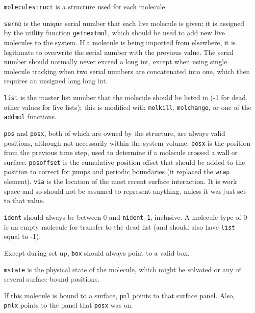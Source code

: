 \documentclass {scrbook}
\newcommand {\ttt} {\texttt}
\begin{document}
\ttt{moleculestruct} is a structure used for each molecule.

\ttt{serno} is the unique serial number that each live molecule is given; it is assigned by the utility function \ttt{getnextmol}, which should be used to add new live molecules to the system. If a molecule is being imported from elsewhere, it is legitimate to overwrite the serial number with the previous value. The serial number should normally never exceed a long int, except when using single molecule tracking when two serial numbers are concatenated into one, which then requires an unsigned long long int.

\ttt{list} is the master list number that the molecule should be listed in (-1 for dead, other values for live lists); this is modified with \ttt{molkill}, \ttt{molchange}, or one of the \ttt{addmol} functions.

\ttt{pos} and \ttt{posx}, both of which are owned by the structure, are always valid positions, although not necessarily within the system volume. \ttt{posx} is the position from the previous time step, used to determine if a molecule crossed a wall or surface. \ttt{posoffset} is the cumulative position offset that should be added to the position to correct for jumps and periodic boundaries (it replaced the \ttt{wrap} element). \ttt{via} is the location of the most recent surface interaction. It is work space and so should not be assumed to represent anything, unless it was just set to that value.

\ttt{ident} should always be between 0 and \ttt{nident-1}, inclusive. A molecule type of 0 is an empty molecule for transfer to the dead list (and should also have \ttt{list} equal to -1).

Except during set up, \ttt{box} should always point to a valid box.

\ttt{mstate} is the physical state of the molecule, which might be solvated or any of several surface-bound positions.

If this molecule is bound to a surface, \ttt{pnl} points to that surface panel. Also, \ttt{pnlx} points to the panel that \ttt{posx} was on.
\end{document}
